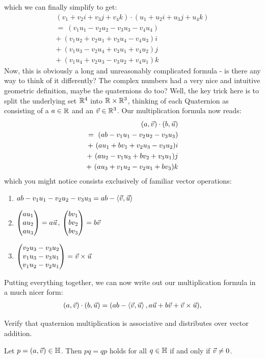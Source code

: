 which we can finally simplify to get:
\begin{align*}
	(v_1 + v_2i + v_3j + v_4k) \cdot (u_1 + u_2i + u_3j + u_4k)\\
	=~ (v_1u_1 - v_2u_2 - v_3u_3 - v_4u_4)\\
	+~ (v_1u_2 + v_2u_1 + v_3u_4 - v_4u_3)i\\
	+~ (v_1u_3 - v_2u_4 + v_3u_1 + v_4u_2)j\\
	+~ (v_1u_4 + v_2u_3 - v_3u_2 + v_4u_1)k
\end{align*}
Now, this is obviously a long and unreasonably complicated formula - is there any way to think of it differently? The complex numbers had a very nice and intuitive geometric definition, maybe the quaternions do too?
\newpar
Well, the key trick here is to split the underlying set $\mathbb{R}^4$ into $\mathbb{R} \times \mathbb{R}^3$, thinking of each Quaternion as consisting of a  $a \in \mathbb{R}$ and an  $\vec{v} \in \mathbb{R}^3$. Our multiplication formula now reads:
\begin{align*}
	(a, \vec{v}) \cdot (b, \vec{u})\\
	=~ (ab - v_1u_1 - v_2u_2 - v_3u_3)\\
	+~ (au_1 + bv_1 + v_2u_3 - v_3u_2)i\\
	+~ (au_2 - v_1u_3 + bv_2 + v_3u_1)j\\
	+~ (au_3 + v_1u_2 - v_2u_1 + bv_3)k
\end{align*}
which you might notice consists exclusively of familiar vector operations:
\begin{enumerate}
	\item $ab - v_1u_1 - v_2u_2 - v_3u_3 = ab - \left\langle \vec{v}, \vec{u} \right\rangle$
	\item $\begin{pmatrix} au_1\\au_2\\au_3\end{pmatrix} = a\vec{u}$, $\begin{pmatrix} bv_1\\bv_2\\bv_3\end{pmatrix} = b\vec{v}$
	\item $\begin{pmatrix} v_2u_3-v_3u_2\\v_1u_3-v_3u_1\\v_1u_2-v_2u_1\end{pmatrix} = \vec{v} \times \vec{u}$
\end{enumerate}
Putting everything together, we can now write out our multiplication formula in a much nicer form:
\begin{align*}
	(a, \vec{v}) \cdot (b, \vec{u}) =
	(ab - \left\langle \vec{v}, \vec{u} \right\rangle, a\vec{u} + b\vec{v} + \vec{v} \times \vec{u}),
\end{align*} 
\begin{exercise}
	Verify that quaternion multiplication is associative and distributes over vector addition.
\end{exercise}
\begin{exercise}
	Let $p = (a,\vec{v}) \in \mathbb{H}$. Then $pq = qp$ holds for all $q \in \mathbb{H}$ if and only if $\vec{v} \neq 0$.
\end{exercise}
